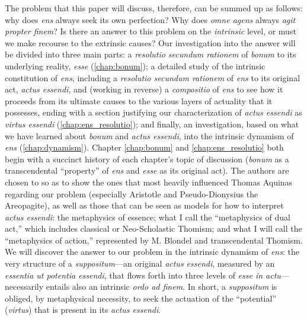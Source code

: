 The problem that this paper will discuss, therefore, can be summed up as follows: why does \emph{ens} always seek its own perfection? Why does \emph{omne agens} always \emph{agit propter finem}? Is there an answer to this problem on the \emph{intrinsic} level, or must we make recourse to the extrinsic causes? Our investigation into the answer will be divided into three main parts: a \emph{resolutio secundum rationem} of \emph{bonum} to its underlying reality, \emph{esse} (\autoref{chap:bonum}); a detailed study of the intrinsic constitution of \emph{ens}, including a \emph{resolutio secundum rationem} of \emph{ens} to its original act, \emph{actus essendi}, and (working in reverse) a \emph{compositio} of \emph{ens} to see how it proceeds from its ultimate causes to the various layers of actuality that it possesses, ending with a section justifying our characterization of \emph{actus essendi} as \emph{virtus essendi} (\autoref{chap:ens_resolutio}); and finally, an investigation, based on what we have learned about \emph{bonum} and \emph{actus essendi}, into the intrinsic dynamism of \emph{ens} (\autoref{chap:dynamism}). Chapter \ref{chap:bonum} and \autoref{chap:ens_resolutio} both begin with a succinct history of each chapter’s topic of discussion (\emph{bonum} as a transcendental “property” of \emph{ens} and \emph{esse} as its original act). The authors are chosen to so as to show the ones that most heavily influenced Thomas Aquinas regarding our problem (especially Aristotle and Pseudo-Dionysius the Areopagite), as well as those that can be seen as models for how to interpret \emph{actus essendi}: the metaphysics of essence; what I call the “metaphysics of dual act,” which includes classical or Neo-Scholastic Thomism; and what I will call the “metaphysics of action,” represented by M. Blondel and transcendental Thomism. We will discover the answer to our problem in the intrinsic dynamism of \emph{ens}: the very structure of a \emph{suppositum}---an original \emph{actus essendi}, measured by an \emph{essentia ut potentia essendi}, that flows forth into three levels of \emph{esse in actu}---necessarily entails also an intrinsic \emph{ordo ad finem}. In short, a \emph{suppositum} is obliged, by metaphysical necessity, to seek the actuation of the “potential” (\emph{virtus}) that is present in its \emph{actus essendi}.